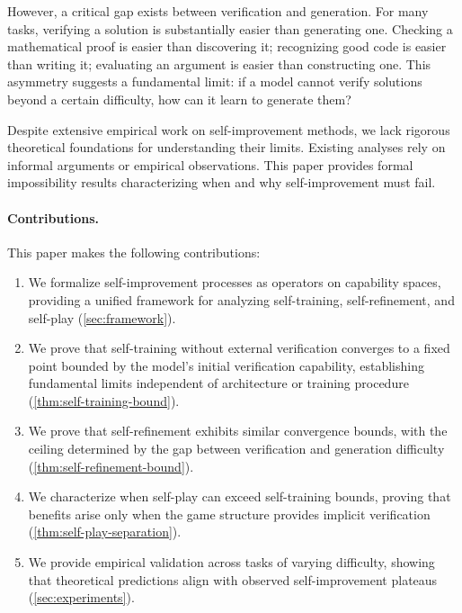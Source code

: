 \documentclass{article}
\theoremstyle{definition}
\theoremstyle{remark}
\begin{document}
However, a critical gap exists between verification and generation. For many tasks, verifying a solution is substantially easier than generating one. Checking a mathematical proof is easier than discovering it; recognizing good code is easier than writing it; evaluating an argument is easier than constructing one. This asymmetry suggests a fundamental limit: if a model cannot verify solutions beyond a certain difficulty, how can it learn to generate them?

Despite extensive empirical work on self-improvement methods, we lack rigorous theoretical foundations for understanding their limits. Existing analyses rely on informal arguments or empirical observations. This paper provides formal impossibility results characterizing when and why self-improvement must fail.

\paragraph{Contributions.} This paper makes the following contributions:

\begin{enumerate}
\item We formalize self-improvement processes as operators on capability spaces, providing a unified framework for analyzing self-training, self-refinement, and self-play (\cref{sec:framework}).

\item We prove that self-training without external verification converges to a fixed point bounded by the model's initial verification capability, establishing fundamental limits independent of architecture or training procedure (\cref{thm:self-training-bound}).

\item We prove that self-refinement exhibits similar convergence bounds, with the ceiling determined by the gap between verification and generation difficulty (\cref{thm:self-refinement-bound}).

\item We characterize when self-play can exceed self-training bounds, proving that benefits arise only when the game structure provides implicit verification (\cref{thm:self-play-separation}).

\item We provide empirical validation across tasks of varying difficulty, showing that theoretical predictions align with observed self-improvement plateaus (\cref{sec:experiments}).
\end{enumerate}
\end{document}
